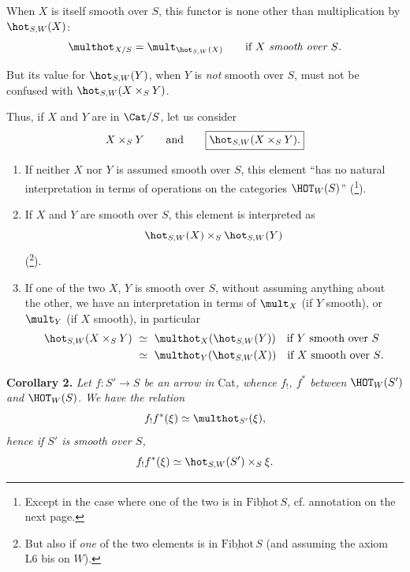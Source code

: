When $X$ is itself smooth over $S$, this functor is none other than multiplication by $\hot_{S,W}(X)$:
\[\multhot_{X/S}=\mult_{\hot_{S,W}(X)}\qquad\text{if $X$ \textit{smooth over $S$.}}\]

But its value for $\hot_{S,W}(Y)$, when $Y$ is \textit{not} smooth over $S$, must not be confused with $\hot_{S,W}(X\times_S Y)$.

Thus, if $X$ and $Y$ are in $\Cat/S$, let us consider
\[X\times_S Y\qquad\text{and}\qquad\boxed{\hot_{S,W}(X\times_S Y).}\] %

\begin{enumerate}
\item[a)] If neither $X$ nor $Y$ is assumed smooth over $S$, this element ``has no natural interpretation in terms of operations on the categories $\HOT_W(S)$'' (\footnote[74]{Except in the case where one of the two is in $\underline{\mathrm{Fibhot}}\,S$, cf. annotation on the next page.}).


\item[b)] If $X$ and $Y$ are smooth over $S$, this element is interpreted as
\[\hot_{S,W}(X)\times_S\hot_{S,W}(Y)\]
(\footnote[75]{But also if \textit{one} of the two elements is in $\underline{\mathrm{Fibhot}}\,S$ (and assuming the axiom L6 bis on $W$).}).

\item[c)] If one of the two $X$, $Y$ is smooth over $S$, without assuming anything about the other, we have an interpretation in terms of $\mult_X$ (if $Y$ smooth), or $\mult_Y$ (if $X$ smooth), in particular
\[\begin{aligned}
\hot_{S,W}(X\times_S Y)\ &\simeq\ \multhot_X(\hot_{S,W}(Y))\quad\text{if $Y$ smooth over $S$}\\
&\simeq\ \multhot_Y(\hot_{S,W}(X))\quad\text{if $X$ smooth over $S$.}
\end{aligned}\]
\end{enumerate}

\textbf{Corollary 2.} \textit{Let $f : S'\longrightarrow S$ be an arrow in} Cat\textit{, whence $f_!$, $f^*$ between} $\HOT_W(S')$ \textit{and} $\HOT_W(S)$\textit{. We have the relation}
\[f_!f^*(\xi)\simeq\multhot_{S'}(\xi),\]
\textit{hence if $S'$ is smooth over $S$,}
\[f_!f^*(\xi)\simeq\hot_{S,W}(S')\times_S\xi.\]

